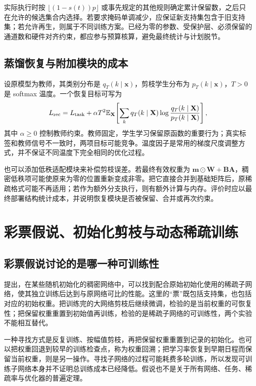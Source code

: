 \documentclass[UTF8,12pt,a4paper,fontset=fandol]{ctexart}
\begin{document}
实际执行时按 $\lfloor(1-s(t))p\rfloor$ 或事先规定的其他规则确定累计保留数，之后只在允许的候选集合内选择。若要求掩码单调减少，应保证新支持集包含于旧支持集；若允许再生，则属于不同训练方案。已经为零的参数、受保护层、必须保留的通道数和硬件对齐约束，都应参与预算核算，避免最终统计与计划脱节。

\subsection{蒸馏恢复与附加模块的成本}
设原模型为教师，其类别分布是 $q_T(k\mid\mathbf x)$，剪枝学生分布为 $p_T(k\mid\mathbf x)$，$T>0$ 是 softmax 温度。一个恢复目标可写为
\begin{equation}
 L_{\rm rec}=L_{\rm task}+\alpha T^2
 \mathbb E_{\mathbf X}\!\left[
 \sum_k q_T(k\mid\mathbf X)
 \log\frac{q_T(k\mid\mathbf X)}{p_T(k\mid\mathbf X)}\right],
 \label{eq:prune-distill}
\end{equation}
其中 $\alpha\geq0$ 控制教师约束。教师固定，学生学习保留原函数的重要行为；真实标签和教师信号不一致时，两项目标可能竞争。温度因子是常用的梯度尺度调整方式，并不保证不同温度下完全相同的优化过程。

也可以添加低秩适配模块来补偿剪枝误差。若最终有效权重为 $\mathbf m\odot\mathbf W+\mathbf B\mathbf A$，稠密低秩项可能使原来为零的位置重新变成非零。把它直接合并到基础矩阵后，原稀疏格式可能不再适用；若作为额外分支执行，则有额外计算与内存。评价时应以最终部署结构统计成本，并说明恢复模块是否被保留、合并或再次约束。

\section{彩票假说、初始化剪枝与动态稀疏训练}
\label{sec:prune-sparse-training}

\subsection{彩票假说讨论的是哪一种可训练性}
提出，在某些随机初始化的稠密网络中，可以找到配合原始初始化使用的稀疏子网络，使其独立训练后达到与原网络可比的性能\cite{frankle2019}。这里的“票”既包括支持集，也包括对应的初始权重。把训练完的大网络剪枝后继续微调，检验的是当前权重的可恢复性；把保留权重重置到初始值再训练，检验的是稀疏子网络的可训练性，两个实验不能相互替代。

一种寻找方式是反复训练、按幅值剪枝，再把保留权重重置到记录的初始化。也可以把权重回退到较早的训练检查点，称为权重回溯；把学习率恢复到早期日程而保留当前权重，则是另一操作。寻找子网络的过程可能耗费多轮训练，所以发现可训练子网络本身并不证明总训练成本已经降低。假说也不是关于所有网络、任务、稀疏率与优化器的普遍定理。
\end{document}
